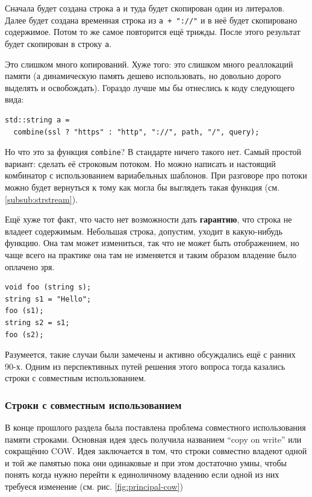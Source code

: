 \documentclass[a4paper,12pt,oneside]{article}
\begin{document}
Сначала будет создана строка \lstinline!a! и туда будет скопирован один из литералов. Далее будет создана временная строка из \lstinline!a + "://"! и в неё будет скопировано содержимое. Потом то же самое повторится ещё трижды. После этого результат будет скопирован в строку \lstinline!a!.

Это слишком много копирований. Хуже того: это слишком много реаллокаций памяти (а динамическую память дешево использовать, но довольно дорого выделять и освобождать). Гораздо лучше мы бы отнеслись к коду следующего вида:

\begin{lstlisting}
std::string a = 
  combine(ssl ? "https" : "http", "://", path, "/", query);
\end{lstlisting}

Но что это за функция \lstinline!combine!? В стандарте ничего такого нет. Самый простой вариант: сделать её строковым потоком. Но можно написать и настоящий комбинатор с использованием вариабельных шаблонов. При разговоре про потоки можно будет вернуться к тому как могла бы выглядеть такая функция (см. \ref{subsub:strstream}).

Ещё хуже тот факт, что часто нет возможности дать \textbf{гарантию}, что строка не владеет содержимым. Небольшая строка, допустим, уходит в какую-нибудь функцию. Она там может измениться, так что не может быть отображением, но чаще всего на практике она там не изменяется и таким образом владение было оплачено зря.

\begin{lstlisting}
void foo (string s);
string s1 = "Hello";
foo (s1);
string s2 = s1;
foo (s2);
\end{lstlisting}

Разумеется, такие случаи были замечены и активно обсуждались ещё с ранних 90-х. Одним из перспективных путей решения этого вопроса тогда казались строки с совместным использованием.

\subsubsection{Строки с совместным использованием}\label{subsub:cow}

В конце прошлого раздела была поставлена проблема совместного использования памяти строками. Основная идея здесь получила названием ``copy on write'' или сокращённо COW. Идея заключается в том, что строки совместно владеют одной и той же памятью пока они одинаковые и при этом достаточно умны, чтобы понять когда нужно перейти к единоличному владению если одной из них требуеся изменение (см. рис. \ref{fig:principal-cow})
\end{document}
